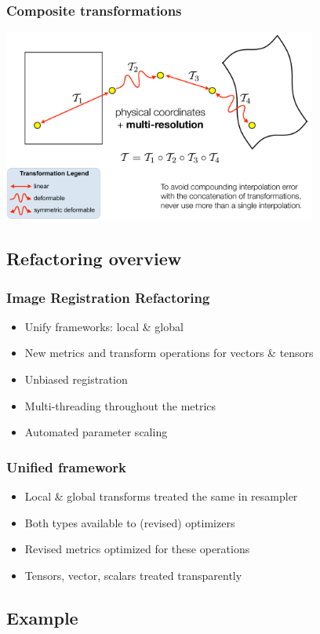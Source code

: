 \begin{frame}
\frametitle{Composite transformations}
\includegraphics[height=2.5in]{../Art/composite}
\end{frame}

\subsection{Refactoring overview}

\begin{frame}
\frametitle{Image Registration Refactoring}
\Large
\begin{itemize}
\item Unify frameworks: local \& global 
\pause
\item New metrics and transform operations for vectors \&  tensors
\pause
\item Unbiased registration
\pause
\item Multi-threading throughout the metrics
\pause 
\item Automated parameter scaling
\end{itemize}
\end{frame}

\begin{frame}
\frametitle{Unified framework}
\Large
\begin{itemize}
\item Local \& global transforms treated the same in resampler
\item Both types available to (revised) optimizers
\item Revised metrics optimized for these operations
\item Tensors, vector, scalars treated transparently
\end{itemize}
\end{frame}
\subsection{Example}

